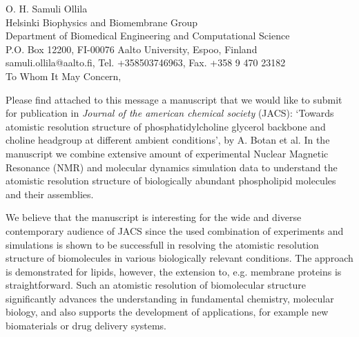 \documentclass[12pt]{letter}
\begin{document}
\reversemarginpar
\pagestyle{empty}
\noindent O. H. Samuli Ollila \\
\noindent Helsinki Biophysics and Biomembrane Group\\
\noindent Department of Biomedical Engineering and Computational Science\\
\noindent P.O. Box 12200, FI-00076 Aalto University, Espoo, Finland\\
\noindent samuli.ollila@aalto.fi, Tel. +358503746963, Fax. +358 9 470 23182 \\


%
%

To Whom It May Concern,

Please find attached to this message a manuscript that we would like to submit for publication 
in \textit{Journal of the american chemical society} (JACS): 
`Towards atomistic resolution structure of phosphatidylcholine glycerol backbone and choline headgroup at different ambient conditions', 
by A. Botan et al. In the manuscript we combine extensive amount of experimental Nuclear Magnetic Resonance (NMR)
and molecular dynamics simulation data to understand the atomistic resolution structure of biologically abundant 
phospholipid molecules and their assemblies.

We believe that the manuscript is interesting for the wide and diverse contemporary audience of
JACS since the used combination of experiments and simulations is shown to be successfull in
resolving the atomistic resolution structure of biomolecules in various biologically relevant conditions.
The approach is demonstrated for lipids, however, the extension to, e.g. membrane proteins is straightforward. 
Such an atomistic resolution of  biomolecular structure
significantly advances the understanding in fundamental chemistry, molecular biology, and also supports the development of applications, 
for example new biomaterials or drug delivery systems.
\end{document}
